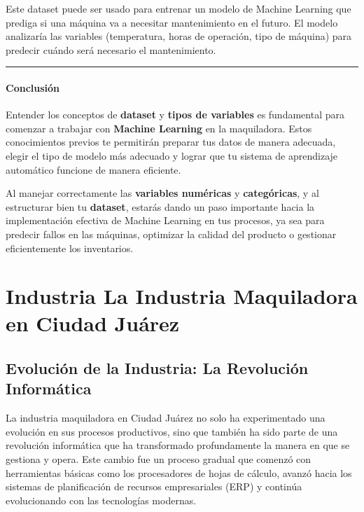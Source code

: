 \documentclass[
  10pt,
  letterpaper,
]{book}
\begin{document}
Este dataset puede ser usado para entrenar un modelo de Machine Learning
que prediga si una máquina va a necesitar mantenimiento en el futuro. El
modelo analizaría las variables (temperatura, horas de operación, tipo
de máquina) para predecir cuándo será necesario el mantenimiento.

\begin{center}\rule{0.5\linewidth}{0.5pt}\end{center}

\subsubsection{Conclusión}\label{conclusiuxf3n}

Entender los conceptos de \textbf{dataset} y \textbf{tipos de variables}
es fundamental para comenzar a trabajar con \textbf{Machine Learning} en
la maquiladora. Estos conocimientos previos te permitirán preparar tus
datos de manera adecuada, elegir el tipo de modelo más adecuado y lograr
que tu sistema de aprendizaje automático funcione de manera eficiente.

Al manejar correctamente las \textbf{variables numéricas} y
\textbf{categóricas}, y al estructurar bien tu \textbf{dataset}, estarás
dando un paso importante hacia la implementación efectiva de Machine
Learning en tus procesos, ya sea para predecir fallos en las máquinas,
optimizar la calidad del producto o gestionar eficientemente los
inventarios.


\chapter{Industria La Industria Maquiladora en Ciudad
Juárez}\label{industria-la-industria-maquiladora-en-ciudad-juuxe1rez}

\section{Evolución de la Industria: La Revolución
Informática}\label{evoluciuxf3n-de-la-industria-la-revoluciuxf3n-informuxe1tica}

La industria maquiladora en Ciudad Juárez no solo ha experimentado una
evolución en sus procesos productivos, sino que también ha sido parte de
una revolución informática que ha transformado profundamente la manera
en que se gestiona y opera. Este cambio fue un proceso gradual que
comenzó con herramientas básicas como los procesadores de hojas de
cálculo, avanzó hacia los sistemas de planificación de recursos
empresariales (ERP) y continúa evolucionando con las tecnologías
modernas.
\end{document}
